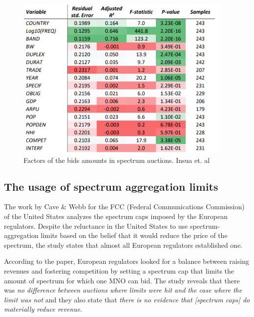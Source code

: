 
\begin{figure}[H]
	\begin{Center}
		\includegraphics[width=0.95\textwidth]{./media/image6.png}
		\caption{Factors of the bids amounts in spectrum auctions. Insua et. al\cite{1-30}}
	\end{Center}
\end{figure}



\subsection*{The usage of spectrum aggregation limits}
The work by Cave $\&$  Webb \cite{1-31} for the FCC (Federal Communications Commission) of the United States analyzes the spectrum caps imposed by the European regulators. Despite the reluctance in the United States to use spectrum-aggregation limits based on the belief that it would reduce the price of the spectrum, the study states that almost all European regulators established one.\par

According to the paper, European regulators looked for a balance between raising revenues and fostering competition by setting a spectrum cap that limits the amount of spectrum for which one MNO can bid. The study reveals that there was \textit{\guillemotleft no difference between auctions where limits were hit and the case where the limit was not\guillemotright } and they also state that \guillemotleft \textit{there is no evidence that [spectrum caps] do materially reduce revenue\guillemotright .}\par

